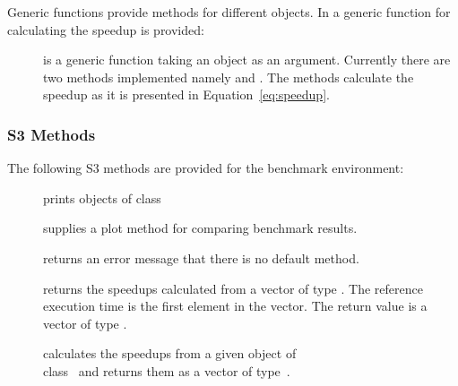 Generic functions provide methods for different objects. In 
a generic function for calculating the speedup is provided:

\begin{description}
\item[] is a generic function taking an object as
  an argument. Currently there are two methods implemented namely
   and . The methods
  calculate the speedup as it is presented in
  Equation~\ref{eq:speedup}.
\end{description}

\subsubsection{S3 Methods}

The following S3 methods are provided for the benchmark environment:

\begin{description}
\item[] prints objects of class 
\item[] supplies a plot method for comparing
  benchmark results.
\item[] returns an error message that there is
  no default method. 
\item[] returns the speedups calculated from a
  vector of type . The reference execution time is  the
  first element in the vector. The return value is a vector of type
  . 
\item[] calculates the speedups from a given
  object of \\class~ and returns them as a vector of
  type~. 
\end{description}

